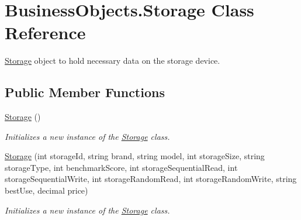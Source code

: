 \hypertarget{class_business_objects_1_1_storage}{}\section{Business\+Objects.\+Storage Class Reference}
\label{class_business_objects_1_1_storage}


\hyperlink{class_business_objects_1_1_storage}{Storage} object to hold necessary data on the storage device.  


\subsection*{Public Member Functions}
\begin{DoxyCompactItemize}
\item 
\hyperlink{class_business_objects_1_1_storage_a4695b8ceeac4b01c2f8b98ef67b01762}{Storage} ()
\begin{DoxyCompactList}\small\item\em Initializes a new instance of the \hyperlink{class_business_objects_1_1_storage}{Storage} class. \end{DoxyCompactList}\item 
\hyperlink{class_business_objects_1_1_storage_aba48b4e57da3d6c05ec55a59987a68f6}{Storage} (int storage\+Id, string brand, string model, int storage\+Size, string storage\+Type, int benchmark\+Score, int storage\+Sequential\+Read, int storage\+Sequential\+Write, int storage\+Random\+Read, int storage\+Random\+Write, string best\+Use, decimal price)
\begin{DoxyCompactList}\small\item\em Initializes a new instance of the \hyperlink{class_business_objects_1_1_storage}{Storage} class. \end{DoxyCompactList}\end{DoxyCompactItemize}
